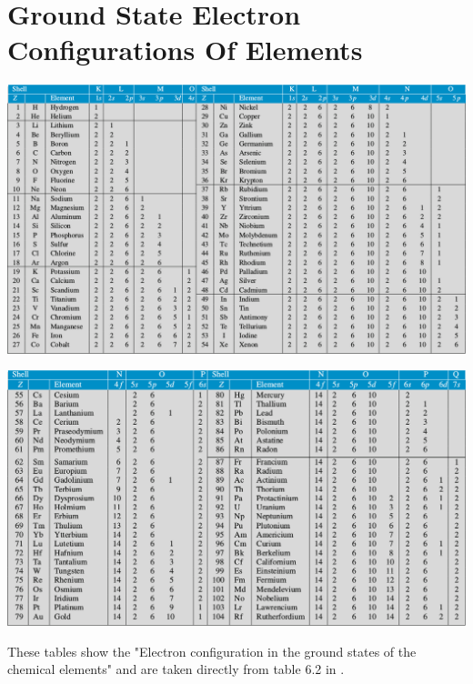 \documentclass[openany,twoside, notitlepage,letterpaper,11pt]{book}
\begin{document}
\section{Ground State Electron Configurations Of Elements}
\begin{center}
\includegraphics[scale=0.6]{./Images/Tables/electron_configuration.png}

\includegraphics[scale=0.6]{./Images/Tables/electron_configuration_2.png}

These tables show the "Electron configuration in the ground states of the chemical elements" and are taken directly from table 6.2 in \cite{Demtroder}.
\end{center}

\newpage
\end{document}
